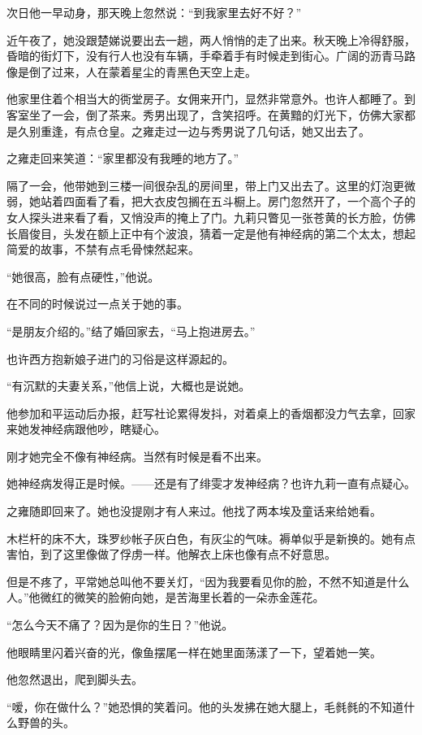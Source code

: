 \par 次日他一早动身，那天晚上忽然说：“到我家里去好不好？”
\par 近午夜了，她没跟楚娣说要出去一趟，两人悄悄的走了出来。秋天晚上冷得舒服，昏暗的街灯下，没有行人也没有车辆，手牵着手有时候走到街心。广阔的沥青马路像是倒了过来，人在蒙着星尘的青黑色天空上走。
\par 他家里住着个相当大的衖堂房子。女佣来开门，显然非常意外。也许人都睡了。到客室坐了一会，倒了茶来。秀男出现了，含笑招呼。在黄黯的灯光下，仿佛大家都是久别重逢，有点仓皇。之雍走过一边与秀男说了几句话，她又出去了。
\par 之雍走回来笑道：“家里都没有我睡的地方了。”
\par 隔了一会，他带她到三楼一间很杂乱的房间里，带上门又出去了。这里的灯泡更微弱，她站着四面看了看，把大衣皮包搁在五斗橱上。房门忽然开了，一个高个子的女人探头进来看了看，又悄没声的掩上了门。九莉只瞥见一张苍黄的长方脸，仿佛长眉俊目，头发在额上正中有个波浪，猜着一定是他有神经病的第二个太太，想起简爱的故事，不禁有点毛骨悚然起来。
\par “她很高，脸有点硬性，”他说。
\par 在不同的时候说过一点关于她的事。
\par “是朋友介绍的。”结了婚回家去，“马上抱进房去。”
\par 也许西方抱新娘子进门的习俗是这样源起的。
\par “有沉默的夫妻关系，”他信上说，大概也是说她。
\par 他参加和平运动后办报，赶写社论累得发抖，对着桌上的香烟都没力气去拿，回家来她发神经病跟他吵，瞎疑心。
\par 刚才她完全不像有神经病。当然有时候是看不出来。
\par 她神经病发得正是时候。——还是有了绯雯才发神经病？也许九莉一直有点疑心。
\par 之雍随即回来了。她也没提刚才有人来过。他找了两本埃及童话来给她看。
\par 木栏杆的床不大，珠罗纱帐子灰白色，有灰尘的气味。褥单似乎是新换的。她有点害怕，到了这里像做了俘虏一样。他解衣上床也像有点不好意思。
\par 但是不疼了，平常她总叫他不要关灯，“因为我要看见你的脸，不然不知道是什么人。”他微红的微笑的脸俯向她，是苦海里长着的一朵赤金莲花。
\par “怎么今天不痛了？因为是你的生日？”他说。
\par 他眼睛里闪着兴奋的光，像鱼摆尾一样在她里面荡漾了一下，望着她一笑。
\par 他忽然退出，爬到脚头去。
\par “嗳，你在做什么？”她恐惧的笑着问。他的头发拂在她大腿上，毛毵毵的不知道什么野兽的头。
